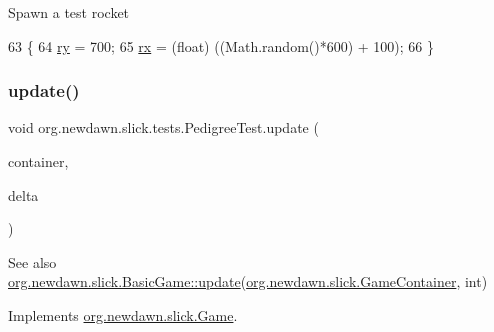Spawn a test rocket 
\begin{DoxyCode}
63                                \{
64         \mbox{\hyperlink{classorg_1_1newdawn_1_1slick_1_1tests_1_1_pedigree_test_aa147061226924390ee1ee625aaa7674a}{ry}} = 700;
65         \mbox{\hyperlink{classorg_1_1newdawn_1_1slick_1_1tests_1_1_pedigree_test_aa8fb781913d72aed3e608682caa8054f}{rx}} = (float) ((Math.random()*600) + 100);
66     \}
\end{DoxyCode}
\mbox{\label{classorg_1_1newdawn_1_1slick_1_1tests_1_1_pedigree_test_abde3a1e882925acbcfa34f83c8070110}} 
\subsubsection{\texorpdfstring{update()}{update()}}
{\footnotesize\ttfamily void org.\+newdawn.\+slick.\+tests.\+Pedigree\+Test.\+update (\begin{DoxyParamCaption}\item[{\mbox{\hyperlink{classorg_1_1newdawn_1_1slick_1_1_game_container}{Game\+Container}}}]{container,  }\item[{int}]{delta }\end{DoxyParamCaption})\hspace{0.3cm}{\ttfamily [inline]}}

\begin{DoxySeeAlso}{See also}
\mbox{\hyperlink{classorg_1_1newdawn_1_1slick_1_1_basic_game_acfe6fa05aef83bff1631af91a3e4bd20}{org.\+newdawn.\+slick.\+Basic\+Game\+::update}}(\mbox{\hyperlink{classorg_1_1newdawn_1_1slick_1_1_game_container}{org.\+newdawn.\+slick.\+Game\+Container}}, int) 
\end{DoxySeeAlso}


Implements \mbox{\hyperlink{interfaceorg_1_1newdawn_1_1slick_1_1_game_ab07b2e9463ee4631620dde0de25bdee8}{org.\+newdawn.\+slick.\+Game}}.


